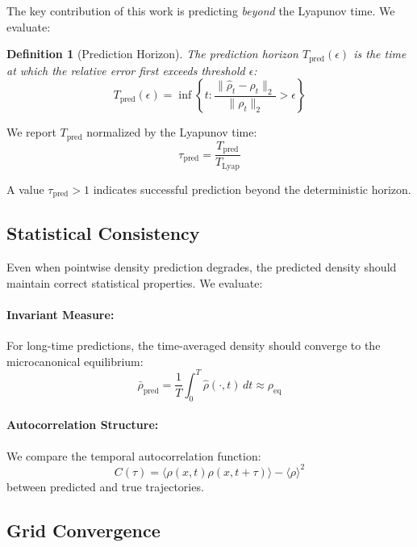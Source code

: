 \documentclass[11pt]{article}
\newtheorem{definition}{Definition}
\begin{document}
The key contribution of this work is predicting \textit{beyond} the Lyapunov time. We evaluate:

\begin{definition}[Prediction Horizon]
The prediction horizon $T_{\text{pred}}(\epsilon)$ is the time at which the relative error first exceeds threshold $\epsilon$:
\begin{equation}
    T_{\text{pred}}(\epsilon) = \inf \left\{ t : \frac{\| \hat{\rho}_t - \rho_t \|_2}{\| \rho_t \|_2} > \epsilon \right\}
\end{equation}
\end{definition}

We report $T_{\text{pred}}$ normalized by the Lyapunov time:
\begin{equation}
    \tau_{\text{pred}} = \frac{T_{\text{pred}}}{T_{\text{Lyap}}}
\end{equation}

A value $\tau_{\text{pred}} > 1$ indicates successful prediction beyond the deterministic horizon.

\subsection{Statistical Consistency}

Even when pointwise density prediction degrades, the predicted density should maintain correct statistical properties. We evaluate:

\paragraph{Invariant Measure:} For long-time predictions, the time-averaged density should converge to the microcanonical equilibrium:
\begin{equation}
    \bar{\rho}_{\text{pred}} = \frac{1}{T} \int_0^T \hat{\rho}(\cdot, t) \, dt \approx \rho_{\text{eq}}
\end{equation}

\paragraph{Autocorrelation Structure:} We compare the temporal autocorrelation function:
\begin{equation}
    C(\tau) = \langle \rho(x, t) \rho(x, t+\tau) \rangle - \langle \rho \rangle^2
\end{equation}
between predicted and true trajectories.

\subsection{Grid Convergence}
\end{document}
